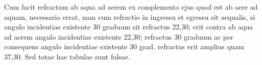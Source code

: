 \pend%
\vspace*{1.5em}%
\pstart%
Cum facit refractum ab aqua ad aerem ex complemento ejus quod est ab aere ad aquam,
necessario errat, nam cum refractio\protect{} in ingressu et egressu sit aequalis,
si angulo incidentiae\protect{} existente 30 graduum sit refractus 22,30;
erit contra ab aqua ad aerem angulo incidentiae existente 22,30;
refractus 30 graduum ac per consequens angulo
incidentiae\protect{} existente
30 grad. refractus erit amplius quam 37,30.
Sed totae hae tabulae sunt falsae.%
\pend%
\count{}
\count{}
\count{}
